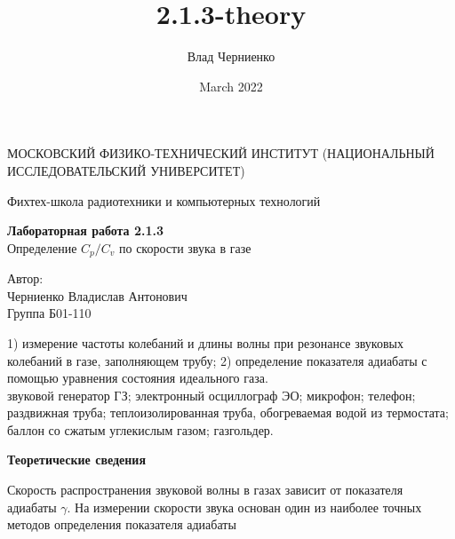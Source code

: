 \documentclass[a4paper, 12pt]{article}
\title{2.1.3-theory}
\author{Влад Черниенко}
\date{March 2022}
\begin{document}
    
    \begin{titlepage}
    
        \begin{center}
                {\large МОСКОВСКИЙ ФИЗИКО-ТЕХНИЧЕСКИЙ ИНСТИТУТ (НАЦИОНАЛЬНЫЙ ИССЛЕДОВАТЕЛЬСКИЙ УНИВЕРСИТЕТ)}
            \end{center}
            \begin{center}
                {\large Фихтех-школа радиотехники и компьютерных технологий}
            \end{center}
            
            \vspace{4.5cm}
            
            {\huge
                \begin{center}
                    {\bf Лабораторная работа 2.1.3}\\
                    Определение $ C_{p}/C_{v} $ по скорости звука в газе
                \end{center}
            }
            
            \vspace{12cm}
            
            \begin{flushright}
                {\LARGE Автор: \\ Черниенко Владислав Антонович \\ \vspace{0.2cm} Группа Б01-110}
            \end{flushright}
    
    \end{titlepage}
 
 
     1) измерение частоты колебаний и длины волны при резонансе звуковых колебаний в газе, заполняющем трубу; 2) определение показателя адиабаты с помощью уравнения состояния идеального газа.\\
    
     звуковой генератор ГЗ; электронный осциллограф ЭО; микрофон; телефон; раздвижная труба; теплоизолированная труба, обогреваемая водой из термостата; баллон со сжатым углекислым газом; газгольдер.\\
   
    \begin{flushleft}
        {\Large {\bf Теоретические сведения}}
    \end{flushleft}
    
    Скорость распространения звуковой волны в газах зависит от показателя адиабаты $ \gamma $. На измерении скорости звука основан один из наиболее точных методов определения показателя адиабаты
    
\end{document}
